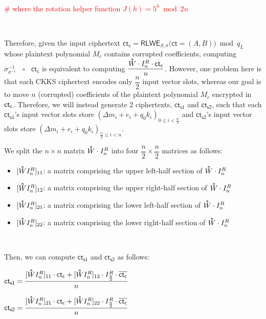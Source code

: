 $ $

\textcolor{red}{ \# where the rotation helper function $J(h) = 5^h \bmod 2n$}

$ $

Therefore, given the input ciphertext $\textsf{ct}_{\textsf{c}} = \textsf{RLWE}_{S, \sigma}\bm{(}\textsf{ct} = (A, B)\bm) \bmod q_L$ whose plaintext polynomial $M_c$ contains corrupted coefficients, computing $\sigma^{-1}_{\sigma^{-1}} \text{ } \circ \text{ } \textsf{ct}_{\textsf{c}}$ is equivalent to computing $\dfrac{\hathat W \cdot I_n^R \cdot \textsf{ct\textsubscript{c}}}{n}$. However, one problem here is that each CKKS ciphertext encodes only $\dfrac{n}{2}$ input vector slots, whereas our goal is to move $n$ (corrupted) coefficients of the plaintext polynomial $M_c$ encrypted in $\textsf{ct\textsubscript{c}}$. Therefore, we will instead generate 2 ciphertexts, $\textsf{ct}_{\textsf{s1}}$ and $\textsf{ct}_{\textsf{s2}}$, such that each $\textsf{ct}_{\textsf{s1}}$'s input vector slots store $(\Delta m_i + e_i + q_0k_i)_{0 \leq i < \frac{n}{2}}$ and $\textsf{ct}_{\textsf{s2}}$'s input vector slots store $(\Delta m_i + e_i + q_0k_i)_{\frac{n}{2} \leq i < n}$. 

We split the $n \times n$ matrix $\hathat W \cdot I_n^R$ into four $\dfrac{n}{2} \times \dfrac{n}{2}$ matrices as follows:

\begin{itemize}
\item $[\hathat WI_n^R]_{11}$: a matrix comprising the upper left-half section of $\hathat W\cdot I_n^R$
\item $[\hathat WI_n^R]_{12}$: a matrix comprising the upper right-half section of $\hathat W\cdot I_n^R$
\item $[\hathat WI_n^R]_{21}$: a matrix comprising the lower left-half section of $\hathat W\cdot I_n^R$
\item $[\hathat WI_n^R]_{22}$: a matrix comprising the lower right-half section of $\hathat W\cdot I_n^R$
\end{itemize}

$ $

Then, we can compute $\textsf{ct}_{\textsf{s1}}$ and $\textsf{ct}_{\textsf{s2}}$ as follows:

$\textsf{ct}_{\textsf{s1}} = \dfrac{[\hathat WI_n^R]_{11} \cdot \textsf{ct\textsubscript{c}} + [\hathat WI_n^R]_{12} \cdot I_{\frac{n}{2}}^R \cdot \mathit{\overline{\textsf{ct\textsubscript{c}}}}}{n}$

$\textsf{ct}_{\textsf{s2}} = \dfrac{[\hathat WI_n^R]_{21} \cdot \textsf{ct\textsubscript{c}} + [\hathat WI_n^R]_{22} \cdot I_{\frac{n}{2}}^R \cdot \mathit{\overline{\textsf{ct\textsubscript{c}}}}}{n}$

